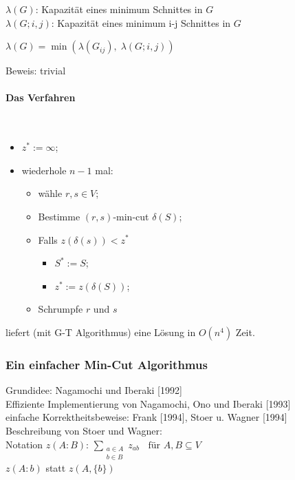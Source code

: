 $\lambda(G)$: Kapazität eines minimum Schnittes in $G$\\
$\lambda(G;i,j)$: Kapazität eines minimum i-j Schnittes in $G$

\begin{lemma}
$\lambda(G) = \min(\lambda(G_{i j}), \; \lambda(G;i,j))$
\end{lemma}

Beweis: trivial

\paragraph{Das Verfahren} \mbox{}\\
{
\renewcommand{\labelitemi}{\mbox{}}
\renewcommand{\labelitemii}{\mbox{}}
\renewcommand{\labelitemiii}{\mbox{}}
\renewcommand{\labelitemiv}{\mbox{}}
\begin{itemize}
\item $z^{\ast} := \infty$;
\item wiederhole $n-1$ mal:
\begin{itemize}
\item wähle $r,s \in V$;
\item Bestimme $(r,s)$-min-cut $\delta(S)$;
\item Falls $z(\delta(s)) < z^{\ast}$
\begin{itemize}
\item $S^{\ast} := S$;
\item $z^{\ast} := z(\delta(S))$;
\end{itemize}
\item Schrumpfe $r$ und $s$
\end{itemize}
\end{itemize}
}
liefert (mit G-T Algorithmus) eine Lösung in $O(n^{4})$ Zeit.

\subsubsection{Ein einfacher Min-Cut Algorithmus}

Grundidee: Nagamochi und Iberaki [1992]\\
Effiziente Implementierung von Nagamochi, Ono und Iberaki [1993]\\
einfache Korrektheitsbeweise: Frank [1994], Stoer u. Wagner [1994]\\
Beschreibung von Stoer und Wagner:\\
Notation $z(A:B)$: $\displaystyle \sum_{\begin{array}{c}a \in A\\b \in B
\end{array}} z_{ab} \; \; \mbox{ für } A, B \subseteq V$\\
$z(A:b)$ statt $z(A,\{b\})$

